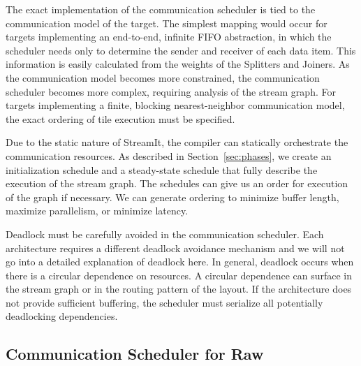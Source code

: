The exact implementation of the communication scheduler is tied to the
communication model of the target.  The simplest mapping would occur
for targets implementing an end-to-end, infinite FIFO abstraction, in
which the scheduler needs only to determine the sender and receiver of
each data item.  This information is easily calculated from the
weights of the Splitters and Joiners.  As the communication model
becomes more constrained, the communication scheduler becomes more
complex, requiring analysis of the stream graph. For targets
implementing a finite, blocking nearest-neighbor communication model,
the exact ordering of tile execution must be specified.

Due to the static nature of StreamIt, the compiler can statically
orchestrate the communication resources.  As described in
Section~\ref{sec:phases}, we create an initialization schedule and a
steady-state schedule that fully describe the execution of the stream
graph.  The schedules can give us an order for execution of the graph
if necessary.  We can generate ordering to minimize buffer length,
maximize parallelism, or minimize latency.


Deadlock must be carefully avoided in the communication
scheduler. Each architecture requires a different deadlock avoidance
mechanism and we will not go into a detailed explanation of deadlock
here.  In general, deadlock occurs when there is a circular dependence
on resources.  A circular dependence can surface in the stream graph
or in the routing pattern of the layout.  If the architecture does not
provide sufficient buffering, the scheduler must serialize all
potentially deadlocking dependencies.


\subsection{Communication Scheduler for Raw}
\label{sec:rawcommunic}

